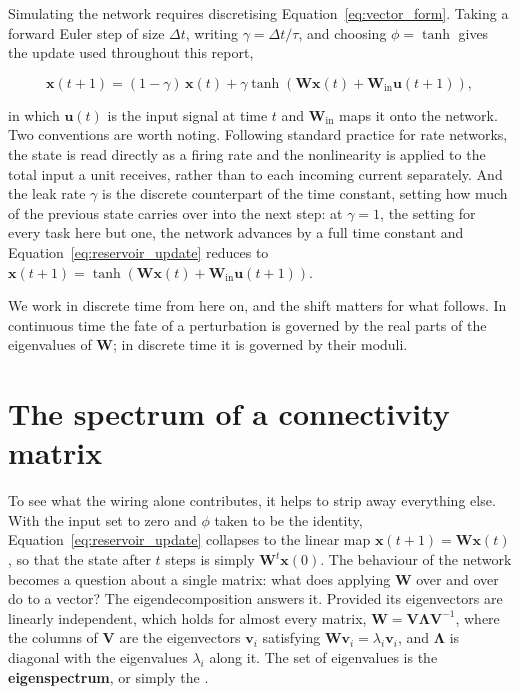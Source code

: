Simulating the network requires discretising Equation~\ref{eq:vector_form}. Taking a forward Euler
step of size $\Delta t$, writing $\gamma = \Delta t / \tau$, and choosing $\phi = \tanh$ gives the
update used throughout this report,

\begin{equation}
    \mathbf{x}(t + 1) = (1 - \gamma)\,\mathbf{x}(t) + \gamma \tanh\!\left(\mathbf{W}\mathbf{x}(t) + \mathbf{W}_{\!\mathrm{in}}\mathbf{u}(t + 1)\right),
    \label{eq:reservoir_update}
\end{equation}

in which $\mathbf{u}(t)$ is the input signal at time $t$ and $\mathbf{W}_{\!\mathrm{in}}$ maps it
onto the network. Two conventions are worth noting. Following standard practice for rate networks,
the state is read directly as a firing rate and the nonlinearity is applied to the total input a unit
receives, rather than to each incoming current separately. And the leak rate $\gamma$ is the discrete
counterpart of the time constant, setting how much of the previous state carries over into the next
step: at $\gamma = 1$, the setting for every task here but one, the network advances by a full time
constant and Equation~\ref{eq:reservoir_update} reduces to
$\mathbf{x}(t+1) = \tanh(\mathbf{W}\mathbf{x}(t) + \mathbf{W}_{\!\mathrm{in}}\mathbf{u}(t+1))$.

We work in discrete time from here on, and the shift matters for what follows. In continuous time the
fate of a perturbation is governed by the real parts of the eigenvalues of $\mathbf{W}$; in discrete
time it is governed by their moduli.




\section{The spectrum of a connectivity matrix}
\label{section:ch2_2}
\bigskip

To see what the wiring alone contributes, it helps to strip away everything else. With the input set
to zero and $\phi$ taken to be the identity, Equation~\ref{eq:reservoir_update} collapses to the linear
map $\mathbf{x}(t+1) = \mathbf{W}\mathbf{x}(t)$, so that the state after $t$ steps is simply
$\mathbf{W}^{t}\mathbf{x}(0)$. The behaviour of the network becomes a question about a single
matrix: what does applying $\mathbf{W}$ over and over do to a vector? The eigendecomposition answers
it. Provided its eigenvectors are linearly independent, which holds for almost every matrix,
$\mathbf{W} = \mathbf{V}\boldsymbol{\Lambda}\mathbf{V}^{-1}$, where the columns of $\mathbf{V}$ are the
eigenvectors $\mathbf{v}_i$ satisfying $\mathbf{W}\mathbf{v}_i = \lambda_i\mathbf{v}_i$, and
$\boldsymbol{\Lambda}$ is diagonal with the eigenvalues $\lambda_i$ along it. The set of eigenvalues is the
\textbf{eigenspectrum}, or simply the .

